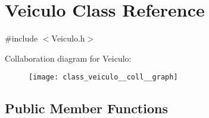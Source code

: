 \hypertarget{class_veiculo}{\section{Veiculo Class Reference}
\label{class_veiculo}
}


{\ttfamily \#include $<$Veiculo.\+h$>$}



Collaboration diagram for Veiculo\+:\nopagebreak
\begin{figure}[H]
\begin{center}
\leavevmode
\texttt{[image: class\_veiculo\_\_coll\_\_graph]}
\end{center}
\end{figure}
\subsection*{Public Member Functions}
